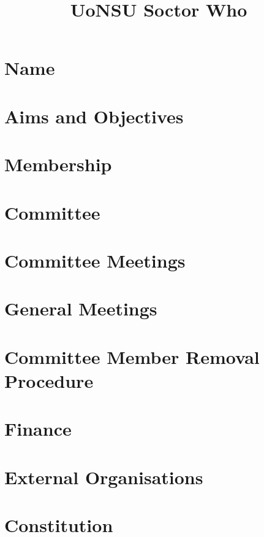 \documentclass[13pt]{article}
\title{UoNSU Soctor Who}
\date{}
\newenvironment{ind}
  {\adjustwidth{2.5em}{0pt}}
  {\endadjustwidth}
\begin{document}
\maketitle

\section{Name}
\begin{ind}

\end{ind}

\section{Aims and Objectives}
\begin{ind}

\end{ind}

\section{Membership}
\begin{ind}

\end{ind}

\section{Committee}
\begin{ind}

\end{ind}

\section{Committee Meetings}
\begin{ind}

\end{ind}

\section{General Meetings}
\begin{ind}

\end{ind}

\section{Committee Member Removal Procedure}
\begin{ind}

\end{ind}

\section{Finance}
\begin{ind}

\end{ind}

\section{External Organisations}
\begin{ind}

\end{ind}

\section{Constitution}
\begin{ind}

\end{ind}
\end{document}
